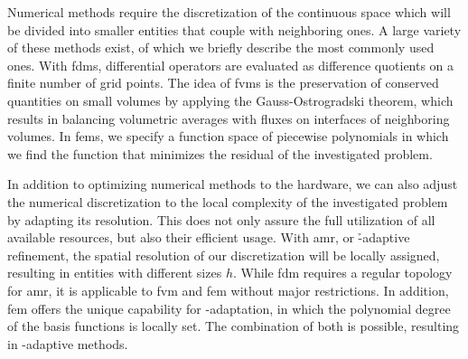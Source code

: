 Numerical methods require the discretization of the continuous space which will be divided into smaller entities that couple with neighboring ones. A large variety of these methods exist, of which we briefly describe the most commonly used ones.
With \glspl{fdm}, differential operators are evaluated as difference quotients on a finite number of grid points. %
The idea of \glspl{fvm} is the preservation of conserved quantities on small volumes by applying the Gauss-Ostrogradski theorem, which results in balancing volumetric averages with fluxes on interfaces of neighboring volumes.
In \glspl{fem}, we specify a function space of piecewise polynomials in which we find the function 
that minimizes the residual of the investigated problem.


In addition to optimizing numerical methods to the hardware, we can also adjust the numerical discretization to the local complexity of the investigated problem by adapting its resolution.
This does not only assure the full utilization of all available resources, but also their efficient usage.
With \gls{amr}, or \h-adaptive refinement, the spatial resolution of our discretization will be locally assigned, resulting in entities with different sizes $h$. While \gls{fdm} requires a regular topology for \gls{amr}, it is applicable to \gls{fvm} and \gls{fem} without major restrictions. In addition, \gls{fem} offers the unique capability for \p-adaptation, in which the polynomial degree of the basis functions is locally set. The combination of both is possible, resulting in \hp-adaptive methods.

